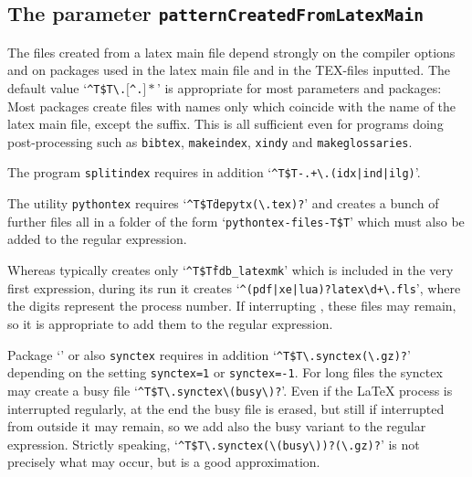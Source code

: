 \subsection{The parameter \texttt{patternCreatedFromLatexMain}}%
\label{subsec:patternCreatedFromLatexMain}

The files created from a latex main file 
depend strongly on the compiler options 
and on packages used in the latex main file 
and in the TEX-files inputted. 
The default value 
`\texttt{\^{}T\$T\textbackslash.$[$\^{}.$]*$}' 
is appropriate for most parameters and packages: 
Most packages create files with names only 
which coincide with the name of the latex main file, except the suffix. 
This is all sufficient even for programs doing post-processing 
such as \texttt{bibtex}, \texttt{makeindex}, \texttt{xindy} and 
\texttt{makeglossaries}. 

The program \texttt{splitindex} requires in addition 
`\texttt{\^{}T\$T-.+\textbackslash.(idx|ind|ilg)}'. %

The utility \texttt{pythontex} requires 
`\texttt{\^{}T\$T\.depytx(\textbackslash.tex)?}' %
and creates a bunch of further files all in a folder of the form 
`\texttt{pythontex-files-T\$T}' which must also be added to the regular expression. 

Whereas typically  creates only `\texttt{\^{}T\$T\.fdb\_latexmk}' 
which is included in the very first expression, 
during its run it creates `\texttt{\^{}(pdf|xe|lua)?latex\textbackslash d+\textbackslash.fls}', %
where the digits represent the process number. 
If interrupting , these files may remain, 
so it is appropriate to add them to the regular expression. 

Package `' or also \texttt{synctex} requires in addition 
`\texttt{\^{}T\$T\textbackslash.synctex(\textbackslash.gz)?}' depending on the setting %
\texttt{synctex=1} or \texttt{synctex=-1}. 
For long files the synctex may create a busy file 
`\texttt{\^{}T\$T\textbackslash.synctex\textbackslash(busy\textbackslash)?}'. 
Even if the \LaTeX{} process is interrupted regularly, 
at the end the busy file is erased, 
but still if interrupted from outside it may remain, 
so we add also the busy variant to the regular expression. 
Strictly speaking, 
`\texttt{\^{}T\$T\textbackslash.synctex(\textbackslash(busy\textbackslash))?(\textbackslash.gz)?}' %
is not precisely what may occur, but is a good approximation. 

